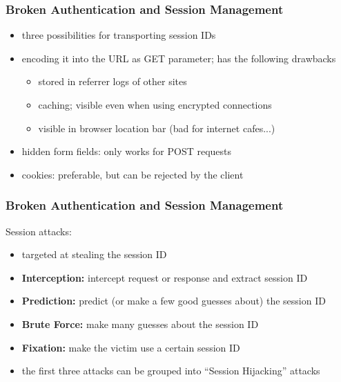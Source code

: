 \documentclass{beamer}
\begin{document}
\begin{frame}
  \frametitle{Broken Authentication and Session Management}
\begin{itemize}\itemsep=1.5ex
\item three possibilities for transporting session IDs
\item \alert<2->{encoding it into the URL as GET parameter}; has the
following drawbacks
\begin{itemize}
\item stored in referrer logs of other sites
\item caching; visible even when using encrypted connections
\item visible in browser location bar (bad for internet cafes...)
\end{itemize}
\item \alert<3->{hidden form fields}: only works for POST requests
\item \alert<4->{cookies}: preferable, but can be rejected by the client
\end{itemize}
\end{frame}

\begin{frame}
  \frametitle{Broken Authentication and Session Management}
Session attacks:
\begin{itemize}\itemsep=1.5ex
\item targeted at stealing the session ID
\item \textbf{Interception:} intercept request or response and extract session
  ID
\item \textbf{Prediction:} predict (or make a few good guesses about) the
  session ID
\item \textbf{Brute Force:} make many guesses about the session ID
\item \textbf{Fixation:} make the victim use a certain session ID
\item the first three attacks can be grouped into ``Session Hijacking''
attacks
\end{itemize}
\end{frame}
\end{document}
